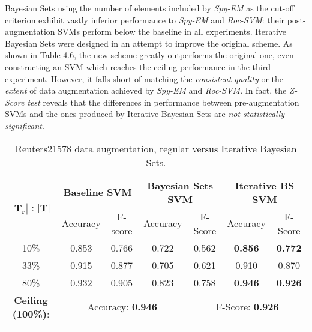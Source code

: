 \documentclass[12pt,twoside,notitlepage,amsart]{report} %
\begin{document}
	
Bayesian Sets using the number of elements included by \emph{Spy-EM} as the cut-off criterion exhibit vastly inferior performance to \emph{Spy-EM} and \emph{Roc-SVM}: their post-augmentation SVMs perform below the baseline in all experiments. 
Iterative Bayesian Sets were designed in an attempt to improve the original scheme. As shown in Table 4.6, the new scheme greatly outperforms the original one, even constructing an SVM which {reaches the ceiling performance} in the third experiment. However, it falls short of matching the \emph{consistent quality} or the \emph{extent} of data augmentation achieved by \emph{Spy-EM} and \emph{Roc-SVM}. In fact, the \emph{Z-Score test} reveals that the differences in performance between pre-augmentation SVMs and the ones produced by Iterative Bayesian Sets are \emph{not statistically significant}. 


	\begin{table} [h]
	
	\begin{center}
	
	\caption{\small{Reuters21578 data augmentation, regular versus Iterative Bayesian Sets.}}
	
	\begin{adjustbox}{center}
	\renewcommand{\arraystretch}{1.2}
	\begin{tabular}{||c||c c||c c|c c|| }
	
	\hline
	
	\multirow{2}{*}{$|\mathbf{T_r}|$ : $|\mathbf{T}|$ } & \multicolumn{2}{|c||}{\textbf{Baseline SVM}} & \multicolumn{2}{|c|}{\textbf{Bayesian Sets SVM}} & \multicolumn{2}{|c||}{\textbf{Iterative BS SVM}}\\\cline{2-7}
	
	& Accuracy & F-score & Accuracy & F-Score & Accuracy & F-Score \\
	\hline \hline
	10\% & 0.853 & 0.766  & 0.722 &	0.562 & \textbf{0.856}	& \textbf{0.772}\\ \hline
	33\% & 0.915 & 0.877  & 0.705	& 0.621 & {0.910}	& {0.870}  \\ \hline 
	80\% & 0.932 & 0.905  & 0.823	& 0.758 & \textbf{0.946}	& \textbf{0.926}   \\ \hline 
	\hline
	\textbf{\small{Ceiling (100\%)}}: & \multicolumn{3}{|c}{ Accuracy: \textbf{0.946} } & \multicolumn{3}{c|}{F-Score: \textbf{0.926}} \\
	}                                                             
	\hline  
	
	\end{tabular}
	\end{adjustbox}
	\end{center}
	\end{table}
	
\end{document}
